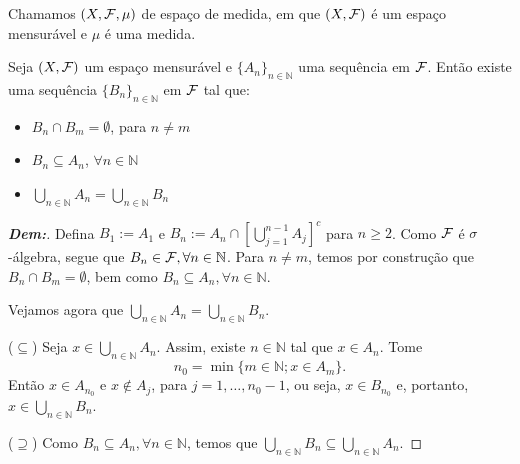 \begin{definition*}{}
Chamamos $(X, \mathcal{F}, \mu)$ de espaço de medida, em que $(X, \mathcal{F})$ é um espaço mensurável e $\mu$ é uma medida.
\end{definition*}

\begin{lemma*}{}
Seja $(X, \mathcal{F})$ um espaço mensurável e $\{A_n\}_{n \in \mathbb{N}}$ uma sequência em $\mathcal{F}$. Então existe uma sequência $\{B_n\}_{n \in \mathbb{N}}$ em $\mathcal{F}$ tal que:
\begin{itemize}
    \item[i)] $B_n \cap B_m = \emptyset$, para $n \neq m$
    \item[ii)] $B_n \subseteq A_n$, $\forall n \in \mathbb{N}$
    \item[iii)] $\bigcup_{n \in \mathbb{N}} A_n = \bigcup_{n \in \mathbb{N}} B_n$
\end{itemize}
\end{lemma*}

\begin{proof}[\textbf{Dem:}]
Defina $B_1 := A_1$ e $B_n := A_n \cap \left[ \bigcup_{j=1}^{n-1} A_j \right]^c$ para $n \ge 2$. 
Como $\mathcal{F}$ é $\sigma$-álgebra, segue que $B_n \in \mathcal{F}, \forall n \in \mathbb{N}$. Para $n \neq m$, temos por construção que $B_n \cap B_m = \emptyset$, bem como $B_n \subseteq A_n, \forall n \in \mathbb{N}$.

Vejamos agora que $\bigcup_{n \in \mathbb{N}} A_n = \bigcup_{n \in \mathbb{N}} B_n$.

($\subseteq$) Seja $x \in \bigcup_{n \in \mathbb{N}} A_n$. Assim, existe $n \in \mathbb{N}$ tal que $x \in A_n$. Tome 
  $$n_0 = \min \{m \in \mathbb{N} ; x \in A_m\}.$$ Então $x \in A_{n_0}$ e $x \notin A_j$, para $j=1,\dots,n_0-1$, ou seja, $x \in B_{n_0}$ e, portanto, $x \in \bigcup_{n \in \mathbb{N}} B_n$.

($\supseteq$) Como $B_n \subseteq A_n, \forall n \in \mathbb{N}$, temos que $\bigcup_{n \in \mathbb{N}} B_n \subseteq \bigcup_{n \in \mathbb{N}} A_n$.
\end{proof}



